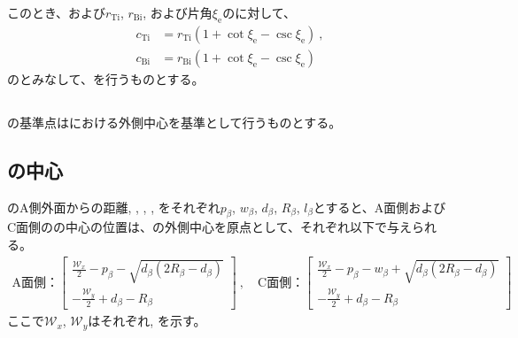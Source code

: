このとき、\TopEndFaceInRChamferRadius および\BottomFaceInRChamferRadius$r_\mathrm{Ti}$, $r_\mathrm{Bi}$, および片角$\xi_\mathrm e$の\TaperEndMill に対して、
\begin{align*}
  c_\mathrm{Ti} &= r_\mathrm{Ti}\left(1+\cot\xi_\mathrm e-\csc\xi_\mathrm e\right)\ ,\\
  c_\mathrm{Bi} &= r_\mathrm{Bi}\left(1+\cot\xi_\mathrm e-\csc\xi_\mathrm e\right)
\end{align*}
の\EndFaceCChamferLength とみなして、\EndFaceInCChamferMilling を行うものとする。



\clearpage


\subsection{\EndFaceBoringMillingReferencePoint}
\EndFaceBoringMilling の基準点は\TopEndFace における外側中心を基準として行うものとする。


\subsection{\EndFaceBoringCornerR の中心}
\EndFaceBoring のA側外面からの距離, \EndFaceBoringWidth, \EndFaceBoringDepth, \EndFaceBoringCornerR, \EndFaceBoringLength をそれぞれ$p_\beta$, $w_\beta$, $d_\beta$, $R_\beta$, $l_\beta$とすると、A面側およびC面側の\EndFaceBoringCornerR の中心の位置は、\TopEndFace の外側中心を原点として、それぞれ以下で与えられる。
\begin{align*}
  \text{A面側：}
  \left[
  \begin{array}{c}
  \displaystyle
  \frac{\mathcal W_x}2-p_\beta-\sqrt{d_\beta(2R_\beta-d_\beta)}\\[8pt]
  \displaystyle
  -\frac{\mathcal W_y}2+d_\beta-R_\beta
  \end{array}
  \right]~,\quad
  \text{C面側：}
  \left[
  \begin{array}{c}
  \displaystyle
  \frac{\mathcal W_x}2-p_\beta-w_\beta+\sqrt{d_\beta(2R_\beta-d_\beta)}\\[8pt]
  \displaystyle
  -\frac{\mathcal W_y}2+d_\beta-R_\beta
  \end{array}
  \right]
\end{align*}
ここで$\mathcal W_x$, $\mathcal W_y$はそれぞれ\TopEndACOD, \TopEndBDOD を示す。


